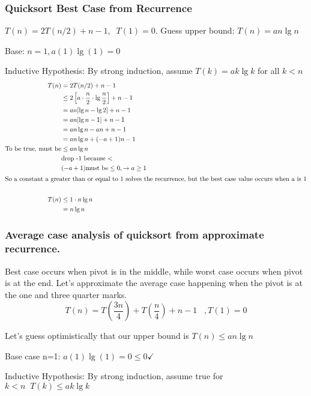\documentclass[english, 10pt]{article}
\begin{document}
\subsubsection{Quicksort Best Case from Recurrence}
$T(n) = 2T(n/2)+n-1, \;\;T(1)=0$. Guess upper bound: $T(n)=an\lg n$


Base: $n=1 , a(1)\lg(1)=0$

Inductive Hypothesis: By strong induction, assume $T(k) = ak\lg k$ for all $k<n$
\begin{align*}
    T(n)&= 2T(n/2)+n-1 \\
    &\le 2\left[ a\cdot \frac{n}{2} \cdot\lg\frac{n}{2} \right] +n-1 \\
    &= an[\lg n - \lg 2] +n-1 \\
    &= an[\lg n -1] +n-1 \\
    &= an\lg n -an +n -1 \\
    &= an\lg n +(-a+1)n -1 \\
    \text{To be true, must be} &\le an\lg n \\
    &\text{drop -1 because <} \\
    &(-a+1) \text{must be} \le 0, \rightarrow a\ge1 \\
    \intertext{So a constant a greater than or equal to 1 solves the recurrence, but the best case value occurs when a is 1} \\
    T(n) &\le 1\cdot n\lg n \\
    &=n\lg n
\end{align*}

\subsubsection{Average case analysis of quicksort from approximate recurrence.}
Best case occurs when pivot is in the middle, while worst case occurs when
pivot is at the end. Let's approximate the average case happening when the
pivot is at the one and three quarter marks.
$$T(n) = T(\frac{3n}{4}) + T(\frac{n}{4}) +n -1 \;\;\;,T(1)=0$$


Let's guess optimistically that our upper bound is $T(n) \le an\lg n$

Base case n=1: $a(1)\lg(1) = 0 \le 0 \checkmark$

Inductive Hypothesis: By strong induction, assume true for $k<n\;\; T(k) \le ak\lg k$
\end{document}
